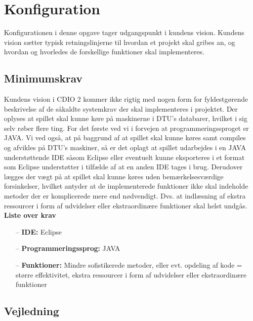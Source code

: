 \chapter{Konfiguration}

Konfigurationen i denne opgave tager udgangspunkt i kundens vision. Kundens vision sætter typisk retningslinjerne til hvordan et projekt skal gribes an, og hvordan og hvorledes de forskellige funktioner skal implementeres.

\section{Minimumskrav}

Kundens vision i CDIO 2 kommer ikke rigtig med nogen form for fyldestgørende beskrivelse af de såkaldte systemkrav der skal implementeres i projektet. 
Der oplyses at spillet skal kunne køre på maskinerne i DTU’s databarer, hvilket i sig selv røber flere ting.
For det første ved vi i forvejen at programmeringssproget er JAVA. 
Vi ved også, at på baggrund af at spillet skal kunne køres samt compiles og afvikles på DTU's maskiner, så er det oplagt at spillet udarbejdes i en JAVA understøttende IDE såsom Eclipse eller eventuelt kunne eksporteres i et format som Eclipse understøtter i tilfælde af at en anden IDE tages i brug. 
Derudover lægges der vægt på at spillet skal kunne køres uden bemærkelsesværdige forsinkelser, hvilket antyder at de implementerede funktioner ikke skal indeholde metoder der er komplicerede mere end nødvendigt. 
Dvs. at indlæsning af ekstra ressourcer i form af udvidelser eller ekstraordinære funktioner skal helst undgås.
\\

\noindent \textbf{Liste over krav}
\begin{itemize}
    \item[--] \textbf{IDE:} Eclipse
    \item[--] \textbf{Programmeringssprog:} JAVA
    \item[--] \textbf{Funktioner:} Mindre sofistikerede metoder, eller evt. opdeling af kode = større effektivitet, ekstra ressourcer i form af udvidelser eller ekstraordinære funktioner
\end{itemize}

\newpage

\section{Vejledning}

